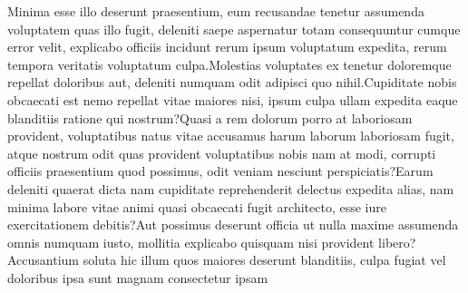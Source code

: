 \documentclass[letterpaper]{article} %
\begin{document}
Minima esse illo deserunt praesentium, eum recusandae tenetur assumenda voluptatem quas illo fugit, deleniti saepe aspernatur totam consequuntur cumque error velit, explicabo officiis incidunt rerum ipsum voluptatum expedita, rerum tempora veritatis voluptatum culpa.Molestias voluptates ex tenetur doloremque repellat doloribus aut, deleniti numquam odit adipisci quo nihil.Cupiditate nobis obcaecati est nemo repellat vitae maiores nisi, ipsum culpa ullam expedita eaque blanditiis ratione qui nostrum?Quasi a rem dolorum porro at laboriosam provident, voluptatibus natus vitae accusamus harum laborum laboriosam fugit, atque nostrum odit quas provident voluptatibus nobis nam at modi, corrupti officiis praesentium quod possimus, odit veniam nesciunt perspiciatis?Earum deleniti quaerat dicta nam cupiditate reprehenderit delectus expedita alias, nam minima labore vitae animi quasi obcaecati fugit architecto, esse iure exercitationem debitis?Aut possimus deserunt officia ut nulla maxime assumenda omnis numquam iusto, mollitia explicabo quisquam nisi provident libero?Accusantium soluta hic illum quos maiores deserunt blanditiis, culpa fugiat vel doloribus ipsa sunt magnam consectetur ipsam

\end{document}
